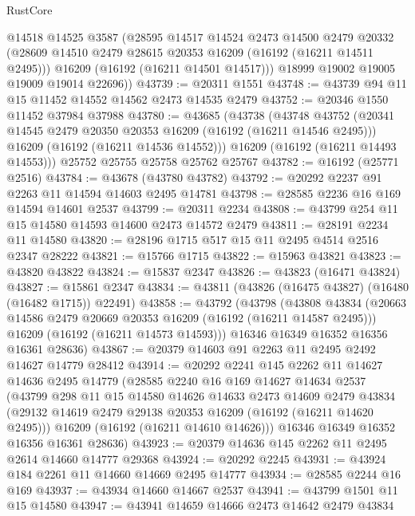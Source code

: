 \begin{lexlean}{RustCore}
\begin{coremodule}
        @14518
        @14525
        @3587
        (@28595
          @14517
          @14524
          @2473
          @14500
          @2479
          @20332
          (@28609 @14510 @2479 @28615 @20353 @16209 (@16192 (@16211 @14511 @2495)))
          @16209
          (@16192 (@16211 @14501 @14517)))
        @18999
        @19002
        @19005
        @19009
        @19014
        @22696))
@43739 := @20311 @1551
@43748 := @43739 @94 @11 @15 @11452 @14552 @14562 @2473 @14535 @2479
@43752 := @20346 @1550 @11452 @37984 @37988
@43780 := @43685
    (@43738
      (@43748
        @43752
        (@20341 @14545 @2479 @20350 @20353 @16209 (@16192 (@16211 @14546 @2495)))
        @16209
        (@16192 (@16211 @14536 @14552)))
      @16209
      (@16192 (@16211 @14493 @14553)))
    @25752
    @25755
    @25758
    @25762
    @25767
@43782 := @16192 (@25771 @2516)
@43784 := @43678 (@43780 @43782)
@43792 := @20292 @2237 @91 @2263 @11 @14594 @14603 @2495 @14781
@43798 := @28585 @2236 @16 @169 @14594 @14601 @2537
@43799 := @20311 @2234
@43808 := @43799 @254 @11 @15 @14580 @14593 @14600 @2473 @14572 @2479
@43811 := @28191 @2234 @11 @14580
@43820 := @28196 @1715 @517 @15 @11 @2495 @4514 @2516 @2347 @28222
@43821 := @15766 @1715
@43822 := @15963 @43821
@43823 := @43820 @43822
@43824 := @15837 @2347
@43826 := @43823 (@16471 @43824)
@43827 := @15861 @2347
@43834 := @43811 (@43826 (@16475 @43827) (@16480 (@16482 @1715)) @22491)
@43858 := @43792
    (@43798
      (@43808
        @43834
        (@20663 @14586 @2479 @20669 @20353 @16209 (@16192 (@16211 @14587 @2495)))
        @16209
        (@16192 (@16211 @14573 @14593)))
      @16346
      @16349
      @16352
      @16356
      @16361
      @28636)
@43867 := @20379 @14603 @91 @2263 @11 @2495 @2492 @14627 @14779 @28412
@43914 := @20292
    @2241
    @145
    @2262
    @11
    @14627
    @14636
    @2495
    @14779
    (@28585
      @2240
      @16
      @169
      @14627
      @14634
      @2537
      (@43799
        @298
        @11
        @15
        @14580
        @14626
        @14633
        @2473
        @14609
        @2479
        @43834
        (@29132 @14619 @2479 @29138 @20353 @16209 (@16192 (@16211 @14620 @2495)))
        @16209
        (@16192 (@16211 @14610 @14626)))
      @16346
      @16349
      @16352
      @16356
      @16361
      @28636)
@43923 := @20379 @14636 @145 @2262 @11 @2495 @2614 @14660 @14777 @29368
@43924 := @20292 @2245
@43931 := @43924 @184 @2261 @11 @14660 @14669 @2495 @14777
@43934 := @28585 @2244 @16 @169
@43937 := @43934 @14660 @14667 @2537
@43941 := @43799 @1501 @11 @15 @14580
@43947 := @43941 @14659 @14666 @2473 @14642 @2479 @43834

\end{coremodule}
\end{lexlean}
